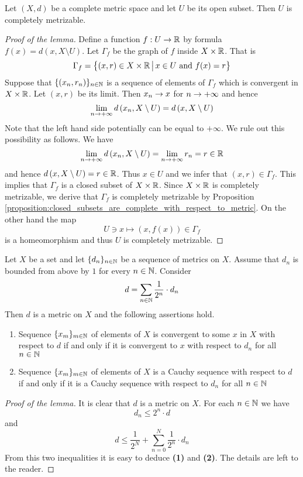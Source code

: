 \begin{lemma}\label{lemma:open_subsets_are_completely_metrizable}
Let $(X,d)$ be a complete metric space and let $U$ be its open subset. Then $U$ is completely metrizable.
\end{lemma}
\begin{proof}[Proof of the lemma]
Define a function $f:U\rightarrow {\mathbb R}$ by formula $f(x) = d\left(x,X\setminus U\right)$. Let $\Gamma_f$ be the graph of $f$ inside $X\times {\mathbb R}$. That is
$$\Gamma_f = \big\{(x,r)\in X\times {\mathbb R}\,\big|\,x\in U\mbox{ and }f(x) = r\big\}$$
Suppose that $\{(x_n,r_n)\}_{n\in {\mathbb N}}$ is a sequence of elements of $\Gamma_f$ which is convergent in $X\times {\mathbb R}$. Let $(x,r)$ be its limit. Then $x_n\rightarrow x$ for $n\rightarrow +\infty$ and hence 
$$\lim_{n\rightarrow +\infty}d\left(x_n,X\setminus U\right) = d\left(x,X\setminus U\right)$$
Note that the left hand side potentially can be equal to $+\infty$. We rule out this possibility as follows. We have
$$\lim_{n\rightarrow +\infty}d\left(x_n,X\setminus U\right) = \lim_{n\rightarrow +\infty}r_n = r \in {\mathbb R}$$
and hence $d\left(x,X\setminus U\right) = r \in {\mathbb R}$. Thus $x \in U$ and we infer that $(x,r) \in \Gamma_f$. This implies that $\Gamma_f$ is a closed subset of $X\times {\mathbb R}$. Since $X\times {\mathbb R}$ is completely metrizable, we derive that $\Gamma_f$ is completely metrizable by Proposition \ref{proposition:closed_subsets_are_complete_with_respect_to_metric}. On the other hand the map
$$U\ni x \mapsto \left(x,f(x)\right) \in \Gamma_f$$
is a homeomorphism and thus $U$ is completely metrizable.
\end{proof}

\begin{lemma}\label{lemma:series_of_metrics_properties}
Let $X$ be a set and let $\{d_n\}_{n\in {\mathbb N}}$ be a sequence of metrics on $X$. Assume that $d_n$ is bounded from above by $1$ for every $n\in {\mathbb N}$. Consider
$$d = \sum_{n\in {\mathbb N}}\frac{1}{2^n}\cdot d_n$$
Then $d$ is a metric on $X$ and the following assertions hold.
\begin{enumerate}[label=\emph{\textbf{(\arabic*)}}, leftmargin=*]
\item Sequence $\{x_m\}_{m\in {\mathbb N}}$ of elements of $X$ is convergent to some $x$ in $X$ with respect to $d$ if and only if it is convergent to $x$ with respect to $d_n$ for all $n\in {\mathbb N}$
\item Sequence $\{x_m\}_{m\in {\mathbb N}}$ of elements of $X$ is a Cauchy sequence with respect to $d$ if and only if it is a Cauchy sequence with respect to $d_n$ for all $n\in {\mathbb N}$
\end{enumerate}
\end{lemma}
\begin{proof}[Proof of the lemma]
It is clear that $d$ is a metric on $X$. For each $n\in {\mathbb N}$ we have 
$$d_n \leq 2^n\cdot d$$
and
$$d \leq \frac{1}{2^{N}} + \sum_{n=0}^N\frac{1}{2^n}\cdot d_n$$
From this two inequalities it is easy to deduce \textbf{(1)} and \textbf{(2)}. The details are left to the reader.
\end{proof}

